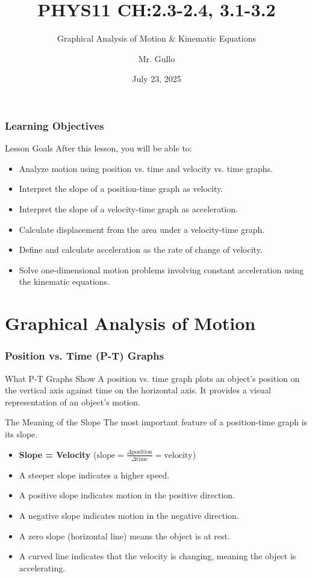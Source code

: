 \documentclass{beamer}
\title[Kinematics Graphs and Equations]{PHYS11 CH:2.3-2.4, 3.1-3.2}
\subtitle{Graphical Analysis of Motion \& Kinematic Equations}
\author[Mr. Gullo]{Mr. Gullo}
\date[Jul 23, 2025]{July 23, 2025}
\begin{document}
\frame{\titlepage}

\begin{frame}[allowframebreaks]
\frametitle{Learning Objectives}
\begin{block}{Lesson Goals}
After this lesson, you will be able to:
\begin{itemize}
    \item Analyze motion using position vs. time and velocity vs. time graphs.
    \item Interpret the slope of a position-time graph as velocity.
    \item Interpret the slope of a velocity-time graph as acceleration.
    \item Calculate displacement from the area under a velocity-time graph.
    \item Define and calculate acceleration as the rate of change of velocity.
    \item Solve one-dimensional motion problems involving constant acceleration using the kinematic equations.
\end{itemize}
\end{block}
\end{frame}

\section{Graphical Analysis of Motion}

\begin{frame}[allowframebreaks]
\frametitle{Position vs. Time (P-T) Graphs}
\begin{block}{What P-T Graphs Show}
A position vs. time graph plots an object's position on the vertical axis against time on the horizontal axis. It provides a visual representation of an object's motion.
\end{block}

\begin{block}{The Meaning of the Slope}
The most important feature of a position-time graph is its \alert{slope}.
\begin{itemize}
    \item \textbf{Slope = Velocity} ($ \text{slope} = \frac{\Delta \text{position}}{\Delta \text{time}} = \text{velocity} $)
    \item A \alert{steeper slope} indicates a \alert{higher speed}.
    \item A \alert{positive slope} indicates motion in the \alert{positive direction}.
    \item A \alert{negative slope} indicates motion in the \alert{negative direction}.
    \item A \alert{zero slope} (horizontal line) means the object is \alert{at rest}.
    \item A \alert{curved line} indicates that the velocity is changing, meaning the object is \alert{accelerating}.
\end{itemize}
\end{block}
\end{frame}
\end{document}
